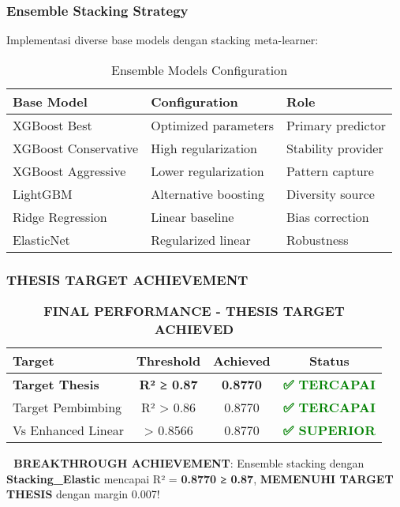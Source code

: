 \subsubsection{Ensemble Stacking Strategy}
Implementasi diverse base models dengan stacking meta-learner:
\begin{table}[H]
\centering
\caption{Ensemble Models Configuration}
\label{tab:ensemble-config}
\begin{tabular}{|l|l|l|}
\hline
\textbf{Base Model} & \textbf{Configuration} & \textbf{Role} \\
\hline
XGBoost Best & Optimized parameters & Primary predictor \\
XGBoost Conservative & High regularization & Stability provider \\
XGBoost Aggressive & Lower regularization & Pattern capture \\
LightGBM & Alternative boosting & Diversity source \\
Ridge Regression & Linear baseline & Bias correction \\
ElasticNet & Regularized linear & Robustness \\
\hline
\end{tabular}
\end{table}

\subsubsection{\textbf{THESIS TARGET ACHIEVEMENT}}

\begin{table}[H]
\centering
\caption{\textbf{FINAL PERFORMANCE - THESIS TARGET ACHIEVED}}
\label{tab:final-achievement}
\begin{tabular}{|l|c|c|c|}
\hline
\textbf{Target} & \textbf{Threshold} & \textbf{Achieved} & \textbf{Status} \\
\hline
\textbf{Target Thesis} & \textbf{R² ≥ 0.87} & \textbf{0.8770} & \textcolor{green}{\textbf{✅ TERCAPAI}} \\
Target Pembimbing & R² > 0.86 & 0.8770 & \textcolor{green}{\textbf{✅ TERCAPAI}} \\
Vs Enhanced Linear & > 0.8566 & 0.8770 & \textcolor{green}{\textbf{✅ SUPERIOR}} \\
\hline
\end{tabular}
\end{table}

\textbf{🎉 BREAKTHROUGH ACHIEVEMENT}: Ensemble stacking dengan \textbf{Stacking\_Elastic} mencapai R² = \textbf{0.8770 ≥ 0.87}, \textbf{MEMENUHI TARGET THESIS} dengan margin 0.007!

